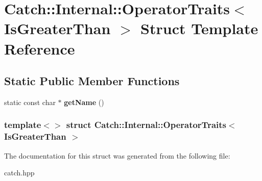 \hypertarget{structCatch_1_1Internal_1_1OperatorTraits_3_01IsGreaterThan_01_4}{
\section{Catch::Internal::OperatorTraits$<$ IsGreaterThan $>$ Struct Template Reference}
\label{structCatch_1_1Internal_1_1OperatorTraits_3_01IsGreaterThan_01_4}
}
\subsection*{Static Public Member Functions}
\begin{DoxyCompactItemize}
\item 
\hypertarget{structCatch_1_1Internal_1_1OperatorTraits_3_01IsGreaterThan_01_4_ab917bfb9ccbe461dc684ee5a34d67d27}{
static const char $\ast$ {\bfseries getName} ()}
\label{structCatch_1_1Internal_1_1OperatorTraits_3_01IsGreaterThan_01_4_ab917bfb9ccbe461dc684ee5a34d67d27}

\end{DoxyCompactItemize}
\subsubsection*{template$<$$>$ struct Catch::Internal::OperatorTraits$<$ IsGreaterThan $>$}



The documentation for this struct was generated from the following file:\begin{DoxyCompactItemize}
\item 
catch.hpp\end{DoxyCompactItemize}
